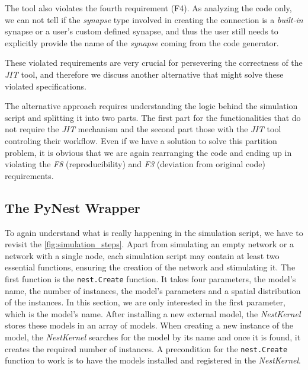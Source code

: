 
The tool also violates the fourth requirement (F4). As analyzing the code only, we can not tell if the \emph{synapse} type involved in creating the connection is a \emph{built-in} synapse or a user's custom defined synapse, and thus the user still  needs to explicitly provide the name of the \emph{synapse} coming from the code generator. 

These violated requirements are very crucial for persevering the correctness of the \emph{JIT} tool, and therefore we discuss  another alternative that might solve these violated specifications.


The alternative approach requires understanding the logic behind the simulation script and splitting it into two parts. The first part for the functionalities that do not require the \emph{JIT} mechanism and the second part those with the \emph{JIT} tool controling their workflow. Even if we have a solution to solve this partition problem, it is obvious that we are again rearranging the code and ending up in violating the \emph{F8} (reproducibility) and \emph{F3} (deviation from original code) requirements.

\subsection{The PyNest Wrapper}

To again understand what is really happening in the simulation script, we have to revisit the \autoref{fig:simulation_steps}. Apart from simulating an empty network or a network with a single node, each simulation script may contain at least two essential functions, ensuring the creation of the network and stimulating it. The first function is the \texttt{nest.Create} function. It takes four parameters, the model's name, the number of instances, the model's parameters and a spatial distribution of the instances. In this section, we are only interested in the first parameter, which is the model's name. After installing a new external model, the \emph{NestKernel} stores these models in an array of models. When creating a new instance of the model, the \emph{NestKernel} searches for the model by its name and once it is found, it creates the required number of instances. A precondition for the \texttt{nest.Create} function to work is to have the models installed and registered in the \emph{NestKernel}.


